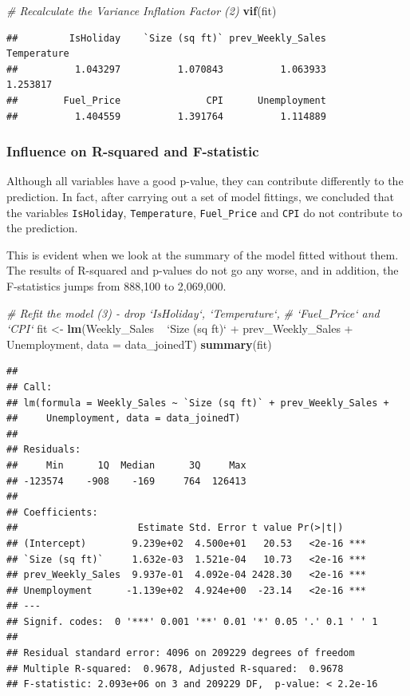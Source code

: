\documentclass[11pt,]{article}
\newenvironment{Shaded}{\begin{snugshade}}{\end{snugshade}}
\newcommand{\KeywordTok}[1]{\textcolor[rgb]{0.13,0.29,0.53}{\textbf{{#1}}}}
\newcommand{\DataTypeTok}[1]{\textcolor[rgb]{0.13,0.29,0.53}{{#1}}}
\newcommand{\StringTok}[1]{\textcolor[rgb]{0.31,0.60,0.02}{{#1}}}
\newcommand{\CommentTok}[1]{\textcolor[rgb]{0.56,0.35,0.01}{\textit{{#1}}}}
\newcommand{\NormalTok}[1]{{#1}}
\begin{document}
\begin{Shaded}
\begin{Highlighting}[]
\CommentTok{# Recalculate the Variance Inflation Factor (2)}
\KeywordTok{vif}\NormalTok{(fit)}
\end{Highlighting}
\end{Shaded}

\begin{verbatim}
##         IsHoliday    `Size (sq ft)` prev_Weekly_Sales       Temperature 
##          1.043297          1.070843          1.063933          1.253817 
##        Fuel_Price               CPI      Unemployment 
##          1.404559          1.391764          1.114889
\end{verbatim}

\subsubsection{Influence on R-squared and
F-statistic}\label{influence-on-r-squared-and-f-statistic}

Although all variables have a good p-value, they can contribute
differently to the prediction. In fact, after carrying out a set of
model fittings, we concluded that the variables \texttt{IsHoliday},
\texttt{Temperature}, \texttt{Fuel\_Price} and \texttt{CPI} do not
contribute to the prediction.

This is evident when we look at the summary of the model fitted without
them. The results of R-squared and p-values do not go any worse, and in
addition, the F-statistics jumps from 888,100 to 2,069,000.

\begin{Shaded}
\begin{Highlighting}[]
\CommentTok{# Refit the model (3) - drop `IsHoliday`, `Temperature`,}
\CommentTok{# `Fuel_Price` and `CPI`}
\NormalTok{fit <-}\StringTok{ }\KeywordTok{lm}\NormalTok{(Weekly_Sales ~}\StringTok{ `}\DataTypeTok{Size (sq ft)}\StringTok{`} \NormalTok{+}\StringTok{ }\NormalTok{prev_Weekly_Sales +}\StringTok{ }
\StringTok{    }\NormalTok{Unemployment, }\DataTypeTok{data =} \NormalTok{data_joinedT)}
\KeywordTok{summary}\NormalTok{(fit)}
\end{Highlighting}
\end{Shaded}

\begin{verbatim}
## 
## Call:
## lm(formula = Weekly_Sales ~ `Size (sq ft)` + prev_Weekly_Sales + 
##     Unemployment, data = data_joinedT)
## 
## Residuals:
##     Min      1Q  Median      3Q     Max 
## -123574    -908    -169     764  126413 
## 
## Coefficients:
##                     Estimate Std. Error t value Pr(>|t|)    
## (Intercept)        9.239e+02  4.500e+01   20.53   <2e-16 ***
## `Size (sq ft)`     1.632e-03  1.521e-04   10.73   <2e-16 ***
## prev_Weekly_Sales  9.937e-01  4.092e-04 2428.30   <2e-16 ***
## Unemployment      -1.139e+02  4.924e+00  -23.14   <2e-16 ***
## ---
## Signif. codes:  0 '***' 0.001 '**' 0.01 '*' 0.05 '.' 0.1 ' ' 1
## 
## Residual standard error: 4096 on 209229 degrees of freedom
## Multiple R-squared:  0.9678, Adjusted R-squared:  0.9678 
## F-statistic: 2.093e+06 on 3 and 209229 DF,  p-value: < 2.2e-16
\end{verbatim}
\end{document}
